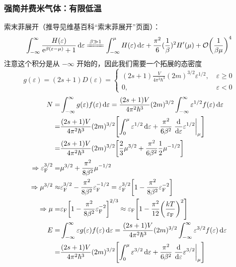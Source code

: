 \subsubsection{强简并费米气体：有限低温}

索末菲展开（推导见维基百科“索末菲展开”页面）：\[
\int_{- \infty}^{\infty} \frac{H(\varepsilon)}{\mathrm{e}^{\beta (\varepsilon - \mu)} + 1} \dd{\varepsilon} \xlongequal{\beta \gg 1} \int_{- \infty}^{\mu} H(\varepsilon) \dd{\varepsilon} + \frac{\pi^2}{6} (\frac{1}{\beta})^2 H'(\mu) + \mathcal{O} \qty(\frac{1}{\beta \mu})^4
\] 注意这个积分是从 $- \infty$ 开始的，因此我们需要一个拓展的态密度 \[
g(\varepsilon) = (2 s + 1) D(\varepsilon) = \begin{cases}
(2 s + 1) \frac{V}{4 \pi^2 \hbar^3} (2 m)^{3/2} \varepsilon^{1/2}, & \ \varepsilon \geq 0\\
0, & \ \varepsilon < 0
\end{cases} \] \begin{align*}
    N = & \int_{- \infty}^{\infty} g(\varepsilon) f(\varepsilon) \dd{\varepsilon} = \frac{(2 s + 1) V}{4 \pi^2 \hbar^3} (2 m)^{3 / 2} \int_{- \infty}^{\infty} \varepsilon^{1 / 2} f(\varepsilon) \dd{\varepsilon}\\
    = & \frac{(2 s + 1) V}{4 \pi^2 \hbar^3} (2 m)^{3 / 2} \qty[\int_0^{\mu} \varepsilon^{1/2} \dd{\varepsilon} + \frac{\pi^2}{6 \beta^2} \left.\dv{\varepsilon} \varepsilon^{1/2} \right|_{\mu}]\\
    = & \frac{(2 s + 1) V}{4 \pi^2 \hbar^3} (2 m)^{3 / 2} \qty[\frac{2}{3} \mu^{3/2} + \frac{\pi^2}{6 \beta^2} \frac{1}{2} \mu^{- 1 / 2}]\\
    \Rightarrow \varepsilon_{\text{F}}^{3/2} = & \mu^{3/2} + \frac{\pi^2}{8 \beta^2} \mu^{- 1 / 2}\\
    \Rightarrow \mu^{3/2} \approx & \varepsilon_{\text{F}}^{3/2} - \frac{\pi^2}{8 \beta^2} \varepsilon_{\text{F}}^{- 1 / 2} = \varepsilon_{\text{F}}^{3/2} \qty[1 - \frac{\pi^2}{8 \beta^2} \varepsilon_{\text{F}}^{- 2}]\\
    \Rightarrow \mu = & \varepsilon_{\text{F}} \qty[1 - \frac{\pi^2}{8 \beta^2} \varepsilon_{\text{F}}^{- 2}]^{2 / 3} \approx \varepsilon_{\text{F}} \qty[1 - \frac{\pi^2}{12} \qty(\frac{k T}{\varepsilon_{\text{F}}})^2]\\
    E = & \int_{- \infty}^{\infty} \varepsilon g(\varepsilon) f(\varepsilon) \dd{\varepsilon} = \frac{(2 s + 1) V}{4 \pi^2 \hbar^3} (2 m)^{3 / 2} \int_{- \infty}^{\infty} \varepsilon^{3 / 2} f(\varepsilon) \dd{\varepsilon}\\
    = & \frac{(2 s + 1) V}{4 \pi^2 \hbar^3} (2 m)^{3 / 2} \qty[\int_0^{\mu} \varepsilon^{3/2} \dd{\varepsilon} + \frac{\pi^2}{6 \beta^2} \left.\dv{\varepsilon} \varepsilon^{3/2} \right|_{\mu}]\\

\end{align*}
